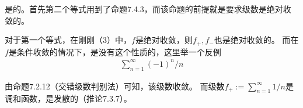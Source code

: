 \documentclass{article}
\begin{document}
是的。首先第二个等式用到了命题7.4.3，而该命题的前提就是要求级数是绝对收敛的。

对于第一个等式，在刚刚（3）中，$f$是绝对收敛，则$f_{+},f_{-}$也是绝对收敛的。
而在$f$是条件收敛的情况下，是没有这个性质的，这里举一个反例
\begin{align*}
    \sum \limits_{n=1}^\infty (-1)^n / n
\end{align*}

由命题7.2.12（交错级数判别法）可知，该级数收敛。
而级数$f_{+} := \sum \limits_{n=1}^\infty 1 / n$是调和函数，是发散的（推论7.3.7）。




\end{document}
